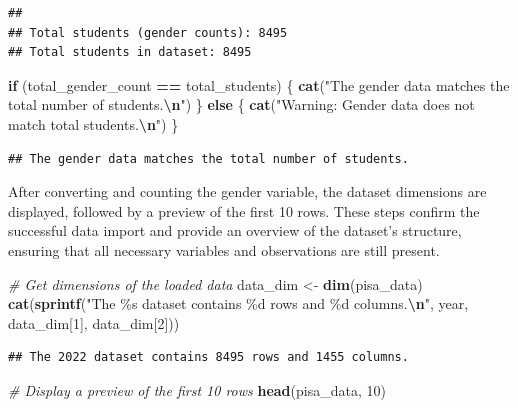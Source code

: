 \documentclass[
]{article}
\newenvironment{Shaded}{\begin{snugshade}}{\end{snugshade}}
\newcommand{\CommentTok}[1]{\textcolor[rgb]{0.56,0.35,0.01}{\textit{#1}}}
\newcommand{\ControlFlowTok}[1]{\textcolor[rgb]{0.13,0.29,0.53}{\textbf{#1}}}
\newcommand{\DecValTok}[1]{\textcolor[rgb]{0.00,0.00,0.81}{#1}}
\newcommand{\FunctionTok}[1]{\textcolor[rgb]{0.13,0.29,0.53}{\textbf{#1}}}
\newcommand{\NormalTok}[1]{#1}
\newcommand{\OtherTok}[1]{\textcolor[rgb]{0.56,0.35,0.01}{#1}}
\newcommand{\SpecialCharTok}[1]{\textcolor[rgb]{0.81,0.36,0.00}{\textbf{#1}}}
\newcommand{\StringTok}[1]{\textcolor[rgb]{0.31,0.60,0.02}{#1}}
\begin{document}
\begin{verbatim}
## 
## Total students (gender counts): 8495
## Total students in dataset: 8495
\end{verbatim}

\begin{Shaded}
\begin{Highlighting}[]
\ControlFlowTok{if}\NormalTok{ (total\_gender\_count }\SpecialCharTok{==}\NormalTok{ total\_students) \{}
    \FunctionTok{cat}\NormalTok{(}\StringTok{"The gender data matches the total number of students.}\SpecialCharTok{\textbackslash{}n}\StringTok{"}\NormalTok{)}
\NormalTok{\} }\ControlFlowTok{else}\NormalTok{ \{}
    \FunctionTok{cat}\NormalTok{(}\StringTok{"Warning: Gender data does not match total students.}\SpecialCharTok{\textbackslash{}n}\StringTok{"}\NormalTok{)}
\NormalTok{\}}
\end{Highlighting}
\end{Shaded}

\begin{verbatim}
## The gender data matches the total number of students.
\end{verbatim}

After converting and counting the gender variable, the dataset
dimensions are displayed, followed by a preview of the first 10 rows.
These steps confirm the successful data import and provide an overview
of the dataset's structure, ensuring that all necessary variables and
observations are still present.

\begin{Shaded}
\begin{Highlighting}[]
\CommentTok{\# Get dimensions of the loaded data}
\NormalTok{data\_dim }\OtherTok{\textless{}{-}} \FunctionTok{dim}\NormalTok{(pisa\_data)}
\FunctionTok{cat}\NormalTok{(}\FunctionTok{sprintf}\NormalTok{(}\StringTok{"The \%s dataset contains \%d rows and \%d columns.}\SpecialCharTok{\textbackslash{}n}\StringTok{"}\NormalTok{, year, data\_dim[}\DecValTok{1}\NormalTok{], data\_dim[}\DecValTok{2}\NormalTok{]))}
\end{Highlighting}
\end{Shaded}

\begin{verbatim}
## The 2022 dataset contains 8495 rows and 1455 columns.
\end{verbatim}

\begin{Shaded}
\begin{Highlighting}[]
\CommentTok{\# Display a preview of the first 10 rows}
\FunctionTok{head}\NormalTok{(pisa\_data, }\DecValTok{10}\NormalTok{)}
\end{Highlighting}
\end{Shaded}
\end{document}
